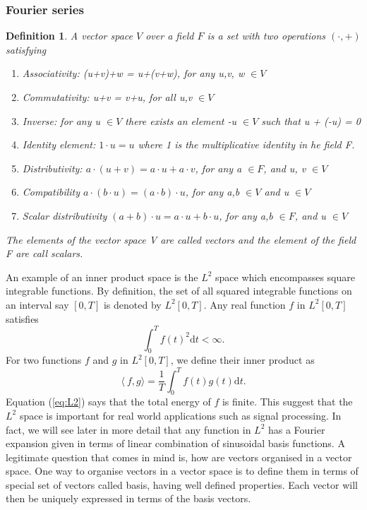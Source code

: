 \documentclass[11pt, oneside]{article}   	%
\newtheorem{definition}{Definition}
\begin{document}
\subsubsection{Fourier series}
\begin{definition}
A vector space $V$ over a field $F$ is a set  with two operations $(\cdot, +)$ satisfying 
\begin{enumerate}
\item Associativity:  (u+v)+w = u+(v+w), for any u,v, w $\in V$
\item Commutativity: u+v = v+u, for all u,v $\in V$
\item Inverse: for any u $\in V$ there exists an element -u $\in V$ such that u + (-u) = 0
\item Identity element: $1\cdot u = u$ where 1 is the multiplicative identity in he field F.
\item Distributivity: $a\cdot(u+v) = a\cdot u + a\cdot v$, for any a $\in F$, and u, v $\in V$
\item Compatibility $a\cdot(b\cdot u) = (a\cdot b)\cdot u$, for any a,b $\in V$ and u $\in V$
\item Scalar distributivity $(a+b)\cdot u = a\cdot u + b\cdot u$, for any a,b $\in F$, and u $\in V$
\end{enumerate}
The elements of the vector space V are called vectors and the element of the field F are call scalars.
\end{definition}
An example of an inner product space is the $L^{2}$ space which encompasses square integrable functions. By definition, the set of all squared integrable functions on an interval say $[0,T]$ is denoted by 
$L^{2}[0,T]$. Any real function $f$ in $L^{2}[0,T]$ satisfies
\begin{equation} \label{eq:L2}
\int_{0}^{T}f(t)^{2}\mathrm{d}t < \infty.
\end{equation}
For two functions $f$ and $g$ in $L^{2}[0,T]$, we define their inner product as 
\begin{equation}
\langle\ f,g \rangle = \frac{1}{T}\int_{0}^{T}f(t)g(t)\mathrm{d}t.
\end{equation}
Equation (\ref{eq:L2}) says that the total energy of $f$ is finite. This suggest that the $L^{2}$ space is important for real world applications such as signal processing. In fact, we will see  later in more detail that any function in $L^{2}$ has a Fourier expansion given in terms of linear combination of sinusoidal basis functions. 
\justify
A legitimate question that comes in mind is, how are vectors organised in a vector space. One way to organise vectors in a vector space is to define them in terms of special set of vectors called basis, having well defined properties. Each vector will then be uniquely expressed in terms of the basis vectors. 
\end{document}
